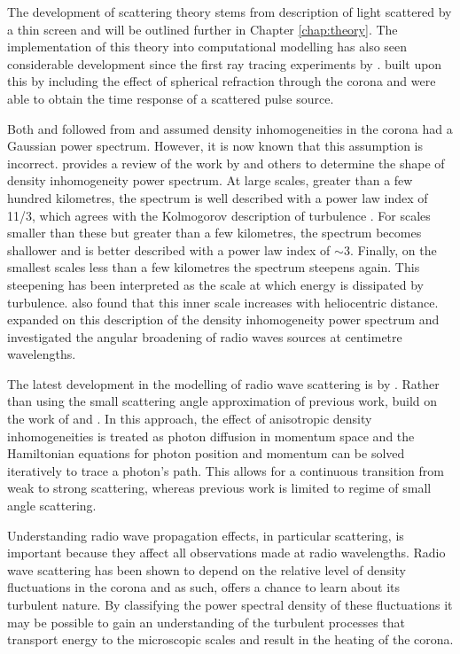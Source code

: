 The development of scattering theory stems from \cite{Chandrasekhar1952} description of light scattered by a thin screen and will be outlined further in Chapter \ref{chap:theory}. The implementation of this theory into computational modelling has also seen considerable development since the first ray tracing experiments by \cite{Fokker1965}. \cite{Steinberg1971} built upon this by including the effect of spherical refraction through the corona and were able to obtain the time response of a scattered pulse source.

Both \cite{Fokker1965} and \cite{Steinberg1971} followed from \cite{Chandrasekhar1952} and assumed density inhomogeneities in the corona had a Gaussian power spectrum. However, it is now known that this assumption is incorrect. \cite{Bastian1994} provides a review of the work by \cite{Coles1989} and others to determine the shape of density inhomogeneity power spectrum. At large scales, greater than a few hundred kilometres, the spectrum is well described with a power law index of 11/3, which agrees with the Kolmogorov description of turbulence \citep{Kolmogorov1941}. For scales smaller than these but greater than a few kilometres, the spectrum becomes shallower and is better described with a power law index of $\sim 3$. Finally, on the smallest scales less than a few kilometres the spectrum steepens again. This steepening has been interpreted as the scale at which energy is dissipated by turbulence. \cite{Coles1989} also found that this inner scale increases with heliocentric distance. \cite{Bastian1994} expanded on this description of the density inhomogeneity power spectrum and investigated the angular broadening of radio waves sources at centimetre wavelengths.

The latest development in the modelling of radio wave scattering is by \cite{Kontar2019}. Rather than using the small scattering angle approximation of previous work, \cite{Kontar2019} build on the work of \cite{Arzner1999} and \cite{Bian2019}. In this approach, the effect of anisotropic density inhomogeneities is treated as photon diffusion in momentum space and the Hamiltonian equations for photon position and momentum can be solved iteratively to trace a photon's path. This allows for a continuous transition from weak to strong scattering, whereas previous work is limited to regime of small angle scattering. 

Understanding radio wave propagation effects, in particular scattering, is important because they affect all observations made at radio wavelengths. Radio wave scattering has been shown to depend on the relative level of density fluctuations in the corona and as such, offers a chance to learn about its turbulent nature. By classifying the power spectral density of these fluctuations it may be possible to gain an understanding of the turbulent processes that transport energy to the microscopic scales and result in the heating of the corona. 

